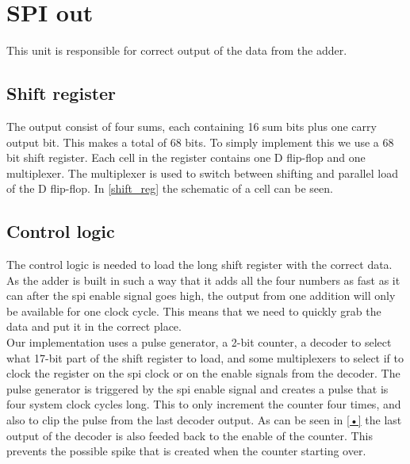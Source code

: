 \section{SPI out}
This unit is responsible for correct output of the data from the adder.




\subsection{Shift register}
The output consist of four sums, each containing 16 sum bits plus one carry output bit. This makes a total of 68 bits. To simply implement this we use a 68 bit shift register. Each cell in the register contains one D flip-flop and one multiplexer. The multiplexer is used to switch between shifting and parallel load of the D flip-flop. In \ref{shift_reg} the schematic of a cell can be seen. 

\begin{figure}

\end{figure}




\subsection{Control logic}
The control logic is needed to load the long shift register with the correct data. \\
As the adder is built in such a way that it adds all the four numbers as fast as it can after the spi enable signal goes high, the output from one addition will only be available for one clock cycle. This means that we need to quickly grab the data and put it in the correct place.\\ 
Our implementation uses a pulse generator, a 2-bit counter, a decoder to select what 17-bit part of the shift register to load, and some multiplexers to select if to clock the register on the spi clock or on the enable signals from the decoder. The pulse generator is triggered by the spi enable signal and creates a pulse that is four system clock cycles long. This to only increment the counter four times, and also to clip the pulse from the last decoder output. As can be seen in \ref{•} the last output of the decoder is also feeded back to the enable of the counter. This prevents the possible spike that is created when the counter starting over. \\

\begin{figure}

\end{figure}


